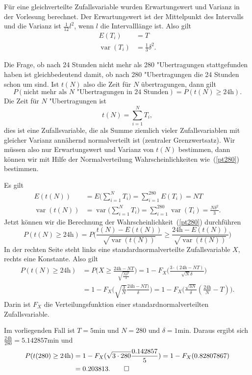 \begin{loesung}
\begin{teilaufgaben}
\item Für eine gleichverteilte Zufallsvariable wurden Erwartungswert
und Varianz in der Vorlesung berechnet.
Der Erwartungswert ist der Mittelpunkt des Intervalls und die
Varianz ist $\frac1{12}l^2$, wenn $l$ die Intervalllänge ist.
Also gilt
\begin{align*}
E(T_i)&=T\\
\operatorname{var}(T_i)&=\frac13\delta^2.
\end{align*}
\item
Die Frage, ob nach 24 Stunden nicht mehr als 280 "Ubertragungen
stattgefunden haben ist gleichbedeutend damit, ob nach 280 "Ubertragungen
die 24 Stunden schon um sind. Ist $t(N)$ also die Zeit für $N$
übertragungen, dann gilt
\begin{equation}
P(\text{nicht mehr als $N$ "Ubertragungen in 24 Stunden})
=
P(t(N) \ge 24\text{h}).
\label{pt280}
\end{equation}
Die Zeit für $N$ "Ubertragungen ist
\[
t(N)=\sum_{i=1}^NT_i,
\]
dies ist eine Zufallsvariable, die als Summe ziemlich vieler
Zufallsvariablen mit gleicher Varianz annähernd normalverteilt ist
(zentraler Grenzwertsatz). Wir müssen also nur Erwartungswert und
Varianz von $t(N)$ bestimmen, dann können wir mit Hilfe der Normalverteilung
Wahrscheinlichkeiten wie~(\ref{pt280}) bestimmen.

Es gilt
\begin{align*}
E(t(N))
&=
E\biggl(\sum_{i=1}^{N}T_i\biggr)
= \sum_{i=1}^{280}E(T_i)=NT\\
\operatorname{var}(t(N))
&=
\operatorname{var}\biggl(\sum_{i=1}^{N}T_i\biggr)
= \sum_{i=1}^{280}\operatorname{var}(T_i)=\frac{N\delta^2}3.
\end{align*}
Jetzt können wir die Berechnung der Wahrscheinlichkeit~(\ref{pt280})
durchführen
\[
P(t(N)\ge \text{24h})=
P\biggl(
\frac{t(N)-E(t(N))}{\sqrt{\operatorname{var}(t(N))}}
\ge
\frac{\text{24h}-E(t(N))}{\sqrt{\operatorname{var}(t(N))}}
\biggr)
\]
In der rechten Seite steht links eine standardnormalverteilte
Zufallsvariable $X$, rechts eine Konstante. Also gilt
\begin{align*}
P(t(N)\ge \text{24h})
&
=
P\biggl(
X\ge
\frac{\text{24h}-NT}{\sqrt{\frac{N\delta^2}3}}
\biggr)
=1-F_X\biggl(
\frac{3\cdot(\text{24h}-NT)}{\sqrt{N}\delta}
\biggr)\\
&
=1-F_X\biggl(
\sqrt{\frac{3}{N}}
\frac{\text{24h}-NT)}{\delta}
\biggr)
=1-F_X\biggl(
\frac{\sqrt{3N}}{\delta}
\left(\frac{\text{24h}}{N}-T\right)
\biggr).
\end{align*}
Darin ist $F_X$ die Verteilungsfunktion einer standardnormalverteilten
Zufallsvariable.

Im vorliegenden Fall ist $T=\text{5min}$ und $N=280$ und $\delta=\text{1min}$.
Daraus ergibt sich $\frac{\text{24h}}{280}=5.142857\text{min}$ und
\begin{align*}
P(t(280)\ge \text{24h})
&=
1-F_X(
\sqrt{3\cdot 280}\frac{0.142857}{5}
)
=1-F_X(0.82807867)
\\
&
=0.203813.
\qedhere
\end{align*}
\end{teilaufgaben}
\end{loesung}

